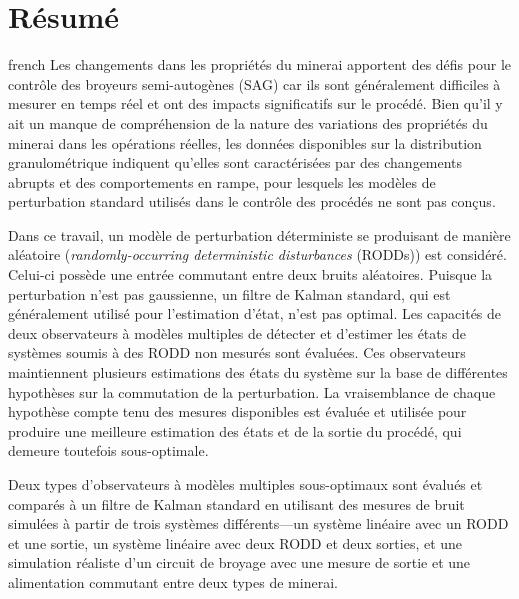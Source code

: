 \chapter*{Résumé}               %
\label{chap-resume}             %

\begin{otherlanguage*}{french}
Les changements dans les propriétés du minerai apportent des défis pour le contrôle des broyeurs semi-autogènes (\acrshort{SAG}) car ils sont généralement difficiles à mesurer en temps réel et ont des impacts significatifs sur le procédé. Bien qu'il y ait un manque de compréhension de la nature des variations des propriétés du minerai dans les opérations réelles, les données disponibles sur la distribution granulométrique indiquent qu'elles sont caractérisées par des changements abrupts et des comportements en rampe, pour lesquels les modèles de perturbation standard utilisés dans le contrôle des procédés ne sont pas conçus.

Dans ce travail, un modèle de perturbation déterministe se produisant de manière aléatoire (\textit{randomly-occurring deterministic disturbances} ({\acrshort{RODD}}s)) est considéré. Celui-ci possède une entrée commutant entre deux bruits aléatoires. Puisque la perturbation n’est pas gaussienne, un filtre de Kalman standard, qui est généralement utilisé pour l’estimation d’état, n’est pas optimal. Les capacités de deux observateurs à modèles multiples de détecter et d’estimer les états de systèmes soumis à des RODD non mesurés sont évaluées. Ces observateurs maintiennent plusieurs estimations des états du système sur la base de différentes hypothèses sur la commutation de la perturbation. La vraisemblance de chaque hypothèse compte tenu des mesures disponibles est évaluée et utilisée pour produire une meilleure estimation des états et de la sortie du procédé, qui demeure toutefois sous-optimale.

Deux types d’observateurs à modèles multiples sous-optimaux sont évalués et comparés à un filtre de Kalman standard en utilisant des mesures de bruit simulées à partir de trois systèmes différents—un système linéaire avec un RODD et une sortie, un système linéaire avec deux RODD et deux sorties, et une simulation réaliste d’un circuit de broyage avec une mesure de sortie et une alimentation commutant entre deux types de minerai.


\end{otherlanguage*}
